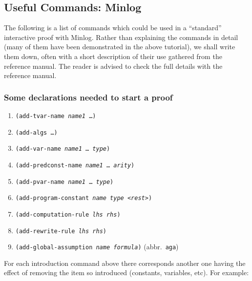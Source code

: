 \documentclass[12pt]{amsart}
\newcommand{\inquotes}[1]{``#1''}
\newcommand{\mi}{Minlog}
\begin{document}
\newpage

\subsection{Useful Commands: \mi}
The following is a list of commands which could be used in a
\inquotes{standard} interactive proof with \mi. Rather than explaining
the commands in detail (many of them have been demonstrated in the
above tutorial), we shall write them down, often with a short
description of their use gathered from the reference manual.  The
reader is advised to check the full details with the reference manual.


\subsubsection{Some declarations needed to start a proof}
\begin{enumerate}[]
\item \texttt{(add-tvar-name \textsl{name1} \dots)}%
\\
\item \texttt{(add-algs \dots)}
\\
\item \texttt{(add-var-name \textsl{name1} \dots\ \textsl{type})}%
\\
\item \texttt{(add-predconst-name \textsl{name1} \dots\ \textsl{arity})}%
\\
\item \texttt{(add-pvar-name \textsl{name1} \dots\ \textsl{type})}%
\\
\item \texttt{(add-program-constant \textsl{name} \textsl{type}
  <\textsl{rest}>)}%
\\
\item \texttt{(add-computation-rule \textsl{lhs} \textsl{rhs})}%
\\
\item \texttt{(add-rewrite-rule \textsl{lhs} \textsl{rhs})}%
\\
\item \texttt{(add-global-assumption \textsl{name} \textsl{formula})}%
  \quad \hbox{(abbr. \texttt{aga})}\\
\end{enumerate}
For each introduction command above there corresponds another one
having the effect of removing the item so introduced (constants,
variables,  etc). For example:
\end{document}
